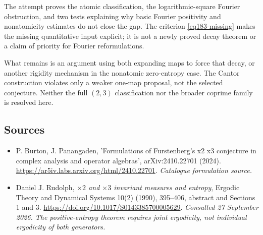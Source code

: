 \documentclass[11pt,a4paper]{article}
\numberwithin{equation}{section}
\begin{document}
The attempt proves the atomic classification, the logarithmic-square
Fourier obstruction, and two tests explaining why basic Fourier
positivity and nonatomicity estimates do not close the gap. The criterion
\eqref{eq183-missing} makes the missing quantitative input explicit; it
is not a newly proved decay theorem or a claim of priority for Fourier
reformulations.

What remains is an argument using both expanding maps to force that decay,
or another rigidity mechanism in the nonatomic zero-entropy case. The
Cantor construction violates only a weaker one-map proposal, not the
selected conjecture. Neither the full $(2,3)$ classification nor the
broader coprime family is resolved here.
\subsection{Sources}
\begin{itemize}\raggedright
\item[\textnormal{[S1]}]\hypertarget{source:statement:1}{} P. Burton, J. Panangaden, 'Formulations of Furstenberg's x2 x3 conjecture in complex analysis and operator algebras', arXiv:2410.22701 (2024).
\url{https://ar5iv.labs.arxiv.org/html/2410.22701}.
{\small\textit{Catalogue formulation source.}}
\item[\textnormal{[E1]}]\hypertarget{extra:statement:1}{} Daniel J. Rudolph,
\emph{$\times2$ and $\times3$ invariant measures and entropy},
Ergodic Theory and Dynamical Systems 10(2) (1990), 395--406,
abstract and Sections 1 and 3.
\url{https://doi.org/10.1017/S0143385700005629}.
{\small\textit{Consulted 27 September 2026. The positive-entropy theorem
requires joint ergodicity, not individual ergodicity of both generators.}}
\end{itemize}
\end{document}

